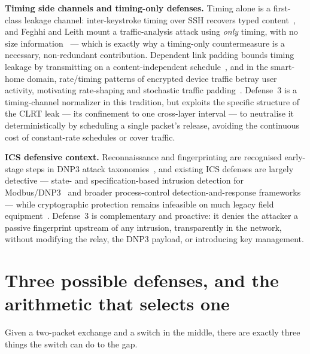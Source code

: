 \documentclass[10pt,a4paper,oneside]{article}
\begin{document}
\textbf{Timing side channels and timing-only defenses.} Timing alone is a first-class leakage
channel: inter-keystroke timing over SSH recovers typed content~\cite{song2001timing}, and
Feghhi and Leith mount a traffic-analysis attack using \emph{only} timing, with no size
information~\cite{feghhi2016timing} --- which is exactly why a timing-only countermeasure is
a necessary, non-redundant contribution. Dependent link padding bounds timing leakage by
transmitting on a content-independent schedule~\cite{wang2008dependent}, and in the smart-home
domain, rate/timing patterns of encrypted device traffic betray user activity, motivating
rate-shaping and stochastic traffic padding~\cite{apthorpe2017spying,apthorpe2019stp}.
Defense~3 is a timing-channel normalizer in this tradition, but exploits the specific
structure of the CLRT leak --- its confinement to one cross-layer interval --- to neutralise
it deterministically by scheduling a single packet's release, avoiding the continuous cost of
constant-rate schedules or cover traffic.

\textbf{ICS defensive context.} Reconnaissance and fingerprinting are recognised early-stage
steps in DNP3 attack taxonomies~\cite{east2009taxonomy}, and existing ICS defenses are largely
detective --- state- and specification-based intrusion detection for
Modbus/DNP3~\cite{fovino2010modbus,lin2013bro} and broader process-control
detection-and-response frameworks~\cite{cardenas2011attacks} --- while cryptographic protection
remains infeasible on much legacy field equipment~\cite{sridhar2012cyber}. Defense~3 is
complementary and proactive: it denies the attacker a passive fingerprint upstream of any
intrusion, transparently in the network, without modifying the relay, the DNP3 payload, or
introducing key management.

\section{Three possible defenses, and the arithmetic that selects one}

Given a two-packet exchange and a switch in the middle, there are exactly three things the
switch can do to the gap.
\end{document}
